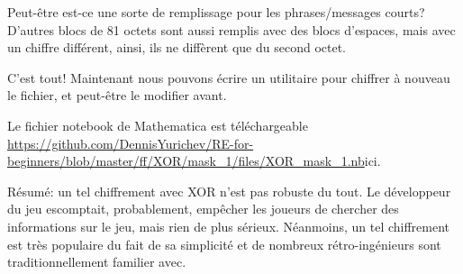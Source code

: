 Peut-être est-ce une sorte de remplissage pour les phrases/messages courts?
D'autres blocs de 81 octets sont aussi remplis avec des blocs d'espaces, mais avec
un chiffre différent, ainsi, ils ne diffèrent que du second octet.

C'est tout! Maintenant nous pouvons écrire un utilitaire pour chiffrer à nouveau le
fichier, et peut-être le modifier avant.

Le fichier notebook de Mathematica est téléchargeable
\url{https://github.com/DennisYurichev/RE-for-beginners/blob/master/ff/XOR/mask_1/files/XOR_mask_1.nb}{ici}.

Résumé: un tel chiffrement avec XOR n'est pas robuste du tout. Le développeur du jeu
escomptait, probablement, empêcher les joueurs de chercher des informations sur le
jeu, mais rien de plus sérieux.
Néanmoins, un tel chiffrement est très populaire du fait de sa simplicité et de nombreux
rétro-ingénieurs sont traditionnellement familier avec.

